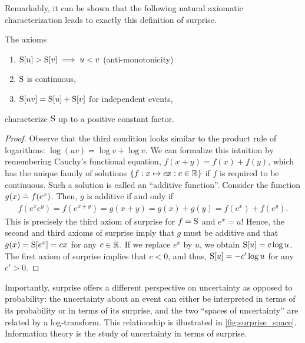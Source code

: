 Remarkably, it can be shown that the following natural axiomatic characterization leads to exactly this definition of surprise.

\begin{thm}
  The axioms \begin{enumerate}
    \item $\S{u} > \S{v} \implies u < v$ (anti-monotonicity) 
    \item $\mathrm{S}$ is continuous,  \\[-5pt]
    \item $\S{uv} = \S{u} + \S{v}$ for independent events, 
  \end{enumerate} characterize $\mathrm{S}$ up to a positive constant factor.
\end{thm}
\begin{proof}
  Observe that the third condition looks similar to the product rule of logarithms: $\log(uv) = \log v + \log v$.
  We can formalize this intuition by remembering Cauchy's functional equation, $f(x + y) = f(x) + f(y)$, which has the unique family of solutions $\{f : x \mapsto c x : c \in \mathbb{R}\}$ if $f$ is required to be continuous.
  Such a solution is called an ``additive function''.
  Consider the function $g(x) \overset{.}{=} f(e^x)$. Then, $g$ is additive if and only if \begin{align*}
    f(e^x e^y) = f(e^{x+y}) = g(x + y) = g(x) + g(y) = f(e^x) + f(e^y).
  \end{align*}
  This is precisely the third axiom of surprise for $f = \mathrm{S}$ and $e^x = u$!
  Hence, the second and third axioms of surprise imply that $g$ must be additive and that $g(x) = \S{e^x} = c x$ for any $c \in \mathbb{R}$.
  If we replace $e^x$ by $u$, we obtain $\S{u} = c \log u$.
  The first axiom of surprise implies that $c < 0$, and thus, $\S{u} = - c' \log u$ for any $c' > 0$.
\end{proof}

Importantly, surprise offers a different perspective on uncertainty as opposed to probability: the uncertainty about an event can either be interpreted in terms of its probability or in terms of its surprise, and the two ``spaces of uncertainty'' are related by a log-transform.
This relationship is illustrated in \cref{fig:surprise_space}.
Information theory is the study of uncertainty in terms of surprise.

